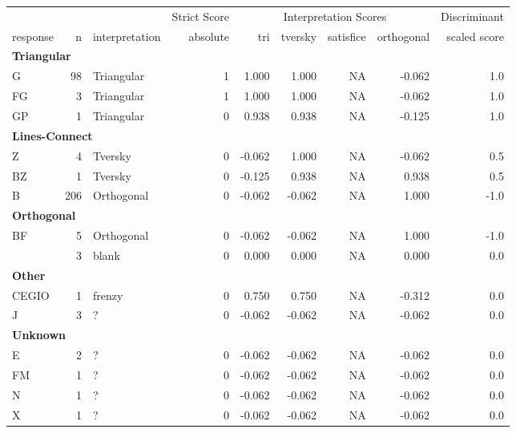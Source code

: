 \documentclass[
  letterpaper,
  DIV=11,
  numbers=noendperiod]{scrreprt}
\begin{document}
\begin{tabular}[t]{l|r|l|r|r|r|r|r|r}
\hline
\multicolumn{3}{c|}{ } & \multicolumn{1}{c|}{Strict Score} & \multicolumn{4}{c|}{Interpretation Scores} & \multicolumn{1}{c}{Discriminant} \\
\cline{4-4} \cline{5-8} \cline{9-9}
response & n & interpretation & absolute & tri & tversky & satisfice & orthogonal & scaled score\\
\hline
\multicolumn{9}{l}{\textbf{Triangular}}\\
\hline
\hspace{1em}G & 98 & Triangular & 1 & 1.000 & 1.000 & NA & -0.062 & 1.0\\
\hline
\hspace{1em}FG & 3 & Triangular & 1 & 1.000 & 1.000 & NA & -0.062 & 1.0\\
\hline
\hspace{1em}GP & 1 & Triangular & 0 & 0.938 & 0.938 & NA & -0.125 & 1.0\\
\hline
\multicolumn{9}{l}{\textbf{Lines-Connect}}\\
\hline
\hspace{1em}Z & 4 & Tversky & 0 & -0.062 & 1.000 & NA & -0.062 & 0.5\\
\hline
\hspace{1em}BZ & 1 & Tversky & 0 & -0.125 & 0.938 & NA & 0.938 & 0.5\\
\hline
\hspace{1em}B & 206 & Orthogonal & 0 & -0.062 & -0.062 & NA & 1.000 & -1.0\\
\hline
\multicolumn{9}{l}{\textbf{Orthogonal}}\\
\hline
\hspace{1em}BF & 5 & Orthogonal & 0 & -0.062 & -0.062 & NA & 1.000 & -1.0\\
\hline
\hspace{1em} & 3 & blank & 0 & 0.000 & 0.000 & NA & 0.000 & 0.0\\
\hline
\multicolumn{9}{l}{\textbf{Other}}\\
\hline
\hspace{1em}CEGIO & 1 & frenzy & 0 & 0.750 & 0.750 & NA & -0.312 & 0.0\\
\hline
\hspace{1em}J & 3 & ? & 0 & -0.062 & -0.062 & NA & -0.062 & 0.0\\
\hline
\multicolumn{9}{l}{\textbf{Unknown}}\\
\hline
\hspace{1em}E & 2 & ? & 0 & -0.062 & -0.062 & NA & -0.062 & 0.0\\
\hline
\hspace{1em}FM & 1 & ? & 0 & -0.062 & -0.062 & NA & -0.062 & 0.0\\
\hline
\hspace{1em}N & 1 & ? & 0 & -0.062 & -0.062 & NA & -0.062 & 0.0\\
\hline
\hspace{1em}X & 1 & ? & 0 & -0.062 & -0.062 & NA & -0.062 & 0.0\\
\hline
\end{tabular}
\end{document}

